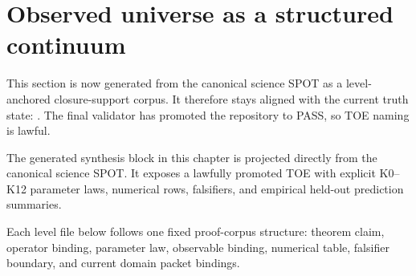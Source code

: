 \section{Observed universe as a structured continuum}
\label{sec:observed-universe-continuum}

This section is now generated from the canonical science SPOT as a level-anchored closure-support corpus.
It therefore stays aligned with the current truth state: . The final validator has promoted the repository to PASS, so TOE naming is lawful.

The generated synthesis block in this chapter is projected directly from the canonical science SPOT. It exposes a lawfully promoted TOE with explicit K0--K12 parameter laws, numerical rows, falsifiers, and empirical held-out prediction summaries.

Each level file below follows one fixed proof-corpus structure: theorem claim, operator binding, parameter law, observable binding, numerical table, falsifier boundary, and current domain packet bindings.














